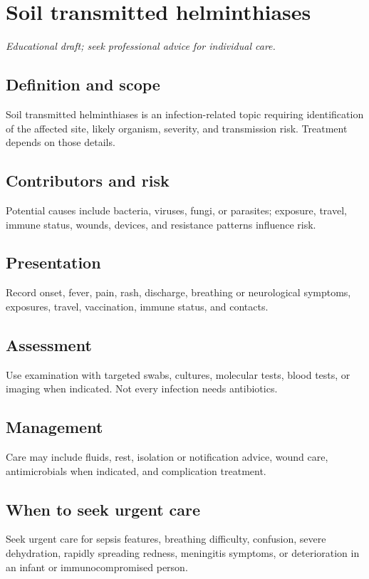 \chapter{Soil transmitted helminthiases}
\medskip
\noindent\textit{Educational draft; seek professional advice for individual care.}

\section*{Definition and scope}
Soil transmitted helminthiases is an infection-related topic requiring identification of the affected site, likely organism, severity, and transmission risk. Treatment depends on those details.

\section*{Contributors and risk}
Potential causes include bacteria, viruses, fungi, or parasites; exposure, travel, immune status, wounds, devices, and resistance patterns influence risk.

\section*{Presentation}
Record onset, fever, pain, rash, discharge, breathing or neurological symptoms, exposures, travel, vaccination, immune status, and contacts.

\section*{Assessment}
Use examination with targeted swabs, cultures, molecular tests, blood tests, or imaging when indicated. Not every infection needs antibiotics.

\section*{Management}
Care may include fluids, rest, isolation or notification advice, wound care, antimicrobials when indicated, and complication treatment.

\section*{When to seek urgent care}
Seek urgent care for sepsis features, breathing difficulty, confusion, severe dehydration, rapidly spreading redness, meningitis symptoms, or deterioration in an infant or immunocompromised person.

